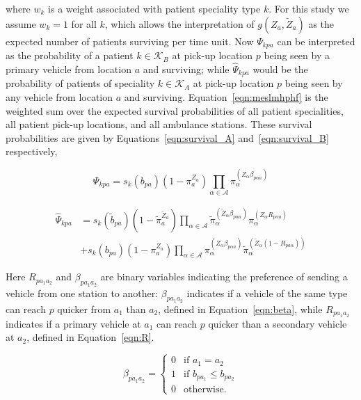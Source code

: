\documentclass[preprint,12pt]{elsarticle}
\begin{document}
\noindent
where $w_k$ is a weight associated with patient speciality type $k$. For this
study we assume $w_k = 1$ for all $k$, which allows the interpretation of
$g\left(Z_a, \tilde{Z}_a\right)$ as the expected number of patients surviving
per time unit. Now $\Psi_{kpa}$ can be interpreted as
the probability of a patient $k \in \mathcal{K}_B$ at pick-up location $p$
being seen by a primary vehicle from location $a$ and surviving; while
$\hat{\Psi}_{kpa}$ would be the probability of patients of speciality
$k \in \mathcal{K}_A$ at pick-up location $p$ being seen by any vehicle from
location $a$ and surviving. Equation~\ref{eqn:meslmhphf} is the weighted sum
over the expected survival probabilities of all patient specialities, all
patient pick-up locations, and all ambulance stations. These survival
probabilities are given by Equations~\ref{eqn:survival_A}
and~\ref{eqn:survival_B} respectively,

\begin{equation}\label{eqn:survival_A}
\Psi_{kpa} = s_k\left( b_{pa} \right)
\left(1 - \pi_{a}^{Z_a} \right)
\prod_{\alpha \in \mathcal{A}}
\pi_{\alpha}^{\left(Z_{\alpha} \beta_{p\alpha a} \right)}
\end{equation}

\begin{align}\label{eqn:survival_B}
\hat{\Psi}_{kpa} &= s_k\left(\tilde{b}_{pa}\right)
\left(1 - \tilde{\pi}_{a}^{\tilde{Z}_a} \right)
\prod_{\alpha \in \mathcal{A}}
\tilde{\pi}_{\alpha}^{\left(\tilde{Z}_{\alpha} \beta_{p\alpha a}\right)}
\pi_{\alpha}^{\left(Z_{\alpha} R_{p \alpha a}\right) } \nonumber \\
&+ s_k\left(b_{pa}\right) \left(1 - \pi_{a}^{Z_a} \right)
\prod_{\alpha \in \mathcal{A}}
\pi_{\alpha}^{\left(Z_{\alpha}\beta_{p\alpha a}\right)}
\tilde{\pi}_{\alpha}^{\left(\tilde{Z}_{\alpha}
\left(1 - R _{p a\alpha}\right)\right)}
\end{align}

Here $R_{p a_1 a_2}$ and $\beta_{p a_1 a_2}$ are binary variables indicating
the preference of sending a vehicle from one station to another:
$\beta_{p a_1 a_2}$ indicates if a vehicle of the same type can reach $p$
quicker from $a_1$ than $a_2$, defined in Equation~\ref{eqn:beta}, while
$R_{p a_1 a_2}$ indicates if a primary vehicle at $a_1$ can reach $p$ quicker
than a secondary vehicle at $a_2$, defined in Equation~\ref{eqn:R}.

\begin{equation}\label{eqn:beta}
\beta_{p a_1 a_2} = \begin{cases}
    0 & \text{if } a_1 = a_2\\
    1 & \text{if } b_{p a_1} \leq b_{p a_2}\\
    0 & \text{otherwise.}
\end{cases}
\end{equation}
\end{document}

